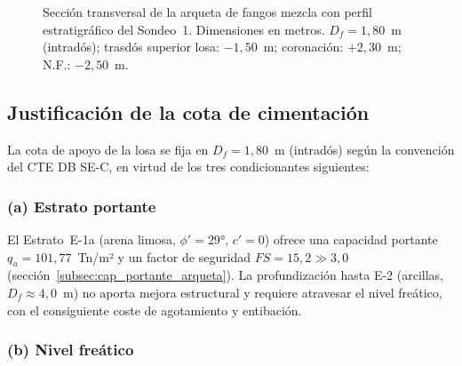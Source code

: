 \begin{figure}[H]
\caption{Sección transversal de la arqueta de fangos mezcla con perfil
         estratigráfico del Sondeo~1. Dimensiones en metros.
         $D_f=1{,}80$~m (intradós); trasdós superior losa: $-1{,}50$~m;
         coronación: $+2{,}30$~m; N.F.: $-2{,}50$~m.}
\label{fig:arqueta_seccion}
\end{figure}

\subsection{Justificación de la cota de cimentación}
\label{subsec:cota_cim}

La cota de apoyo de la losa se fija en $D_f=1{,}80$~m (intradós) según la
convención del CTE DB SE-C, en virtud de los tres condicionantes siguientes:

\subsubsection*{(a) Estrato portante}

El Estrato~E-1a (arena limosa, $\phi'=29°$, $c'=0$) ofrece una capacidad
portante $q_u=101{,}77$~Tn/m² y un factor de seguridad $FS=15{,}2\gg3{,}0$
(sección~\ref{subsec:cap_portante_arqueta}).
La profundización hasta E-2 (arcillas, $D_f\approx4{,}0$~m) no aporta
mejora estructural y requiere atravesar el nivel freático,
con el consiguiente coste de agotamiento y entibación.

\subsubsection*{(b) Nivel freático}

